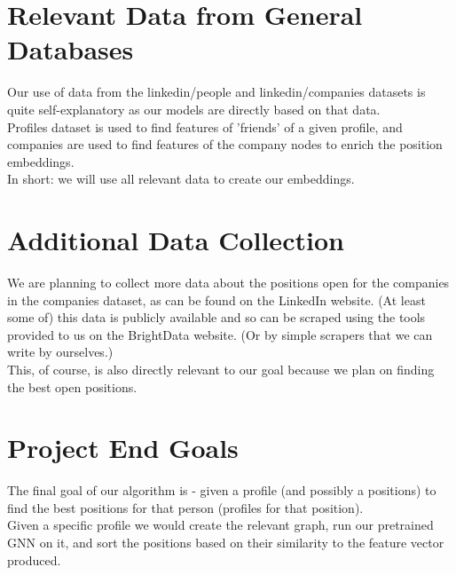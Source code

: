 \documentclass[11pt, oneside]{article}   	%
\begin{document}
\section{Relevant Data from General Databases}
Our use of data from the linkedin/people and linkedin/companies datasets is quite self-explanatory as our models are directly based on that data.\\
Profiles dataset is used to find features of 'friends' of a given profile, and companies are used to find features of the company nodes to enrich the position embeddings.\\
In short: we will use all relevant data to create our embeddings. 

\section{Additional Data Collection}
We are planning to collect more data about the positions open for the companies in the companies dataset, as can be found on the LinkedIn website. (At least some of) this data is publicly available and so can be scraped using the tools provided to us on the BrightData website. (Or by simple scrapers that we can write by ourselves.)\\
This, of course, is also directly relevant to our goal because we plan on finding the best open positions.

\section{Project End Goals}
The final goal of our algorithm is - given a profile (and possibly a positions) to find the best positions for that person (profiles for that position).\\
Given a specific profile we would create the relevant graph, run our pretrained GNN on it, and sort the positions based on their similarity to the feature vector produced.
\end{document}
